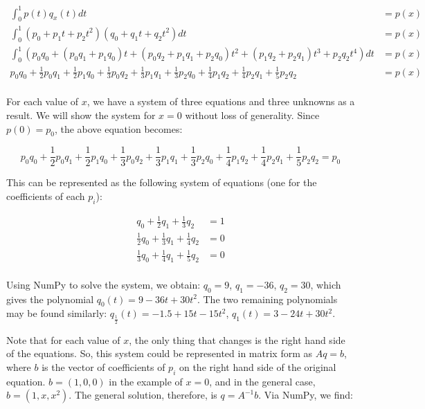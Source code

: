 \documentclass[fleqn]{homework}
\begin{document}
\begin{problem}{4}
\begin{enumerate}[(a)]
      \begin{align*}
        \int_0^1 p(t)q_x(t) dt &= p(x) \\
        \int_0^1 (p_0 + p_1t + p_2t^2)(q_0 + q_1t + q_2t^2)dt &= p(x) \\
        \int_0^1 (p_0q_0 + (p_0q_1 + p_1q_0)t + (p_0q_2 + p_1q_1 + p_2q_0)t^2 + (p_1q_2 + p_2q_1)t^3 + p_2q_2t^4)dt &= p(x) \\
        p_0q_0 + \frac{1}{2}p_0q_1 + \frac{1}{2}p_1q_0 + \frac{1}{3}p_0q_2 + \frac{1}{3}p_1q_1 + \frac{1}{3}p_2q_0 + \frac{1}{4}p_1q_2 + \frac{1}{4}p_2q_1 + \frac{1}{5}p_2q_2 &= p(x) \\
      \end{align*}

      For each value of $x$, we have a system of three equations and three
      unknowns as a result.  We will show the system for $x=0$ without loss of
      generality.  Since $p(0) = p_0$, the above equation becomes:

      \begin{equation*}
        p_0q_0 + \frac{1}{2}p_0q_1 + \frac{1}{2}p_1q_0 + \frac{1}{3}p_0q_2 + \frac{1}{3}p_1q_1 + \frac{1}{3}p_2q_0 + \frac{1}{4}p_1q_2 + \frac{1}{4}p_2q_1 + \frac{1}{5}p_2q_2 = p_0
      \end{equation*}

      This can be represented as the following system of equations (one for the
      coefficients of each $p_i$):

      \begin{align*}
        q_0 + \frac{1}{2} q_1 + \frac{1}{3} q_2 &= 1 \\
        \frac{1}{2}q_0 + \frac{1}{3}q_1 + \frac{1}{4}q_2 &= 0 \\
        \frac{1}{3}q_0 + \frac{1}{4}q_1 + \frac{1}{5}q_2 &= 0 \\
      \end{align*}

      Using NumPy to solve the system, we obtain: $q_0 = 9$, $q_1 = -36$,
      $q_2 = 30$, which gives the polynomial $q_0(t) = 9 - 36t + 30t^2$.  The
      two remaining polynomials may be found similarly:
      $q_{\frac{1}{2}}(t) = -1.5 + 15 t - 15 t^2$, $q_1(t) = 3 - 24t + 30t^2$.

      Note that for each value of $x$, the only thing that changes is the right
      hand side of the equations.  So, this system could be represented in
      matrix form as $Aq = b$, where $b$ is the vector of coefficients of $p_i$
      on the right hand side of the original equation.  $b = (1, 0, 0)$ in the
      example of $x=0$, and in the general case, $b = (1, x, x^2)$.  The general
      solution, therefore, is $q = A^{-1}b$.  Via NumPy, we find:


\end{enumerate}
\end{problem}
\end{document}
